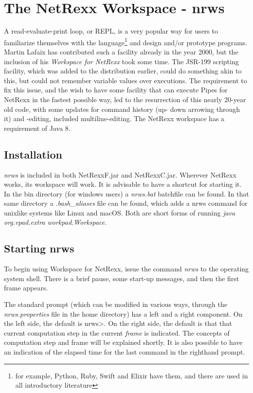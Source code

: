 \chapter{The NetRexx Workspace - nrws}
A read-evaluate-print  loop, or REPL, is a very popular way for users to familiarize themselves with the language\footnote{for example, Python, Ruby, Swift and Elixir have them, and there are used in all introductory literature} and design and/or prototype programs. Martin Lafaix has contributed such a facility already in the year 2000, but the inclusion of his \emph{Workspace for NetRexx} took some time. The JSR-199 scripting facility, which was added to the distribution earlier, could do something akin to this, but could not remember variable values over executions. The requirement to fix this issue, and the wish to have some facility that can execute Pipes for NetRexx in the fastest possible way, led to the resurrection of this nearly 20-year old code, with some updates for command history (up- down arrowing through it) and -editing, included multiline-editing. The NetRexx workspace has a requirement of Java 8.

 \section{Installation}
 \emph{nrws} is included in both NetRexxF.jar and NetRexxC.jar. Wherever NetRexx works, its workspace will work.
 It is advisable to have a shortcut for starting it. In the bin directory (for windows users) a \emph{nrws.bat} batchfile can be found. In that same directory a \emph{.bash\_aliases} file can be found, which adds a nrws command for unixlike systems like Linux and macOS. Both are short forms of running \emph{java org.vpad.extra workpad.Workspace}.

\section{Starting nrws}

To begin using Workspace for NetRexx, issue the command \emph{nrws} to the operating system shell. There is a brief pause, some start-up messages, and then the first frame appears.

The standard prompt (which can be modified in various ways, through the \emph{nrws.properties} file in the home directory) has a left and a right component. On the left side, the default is nrws>. On the right side, the default is that that current computation step in the current \emph{frame} is indicated. The concepts of computation step and frame will be explained shortly. It is also possible to have an indication of the elapsed time for the last command in the righthand prompt.

